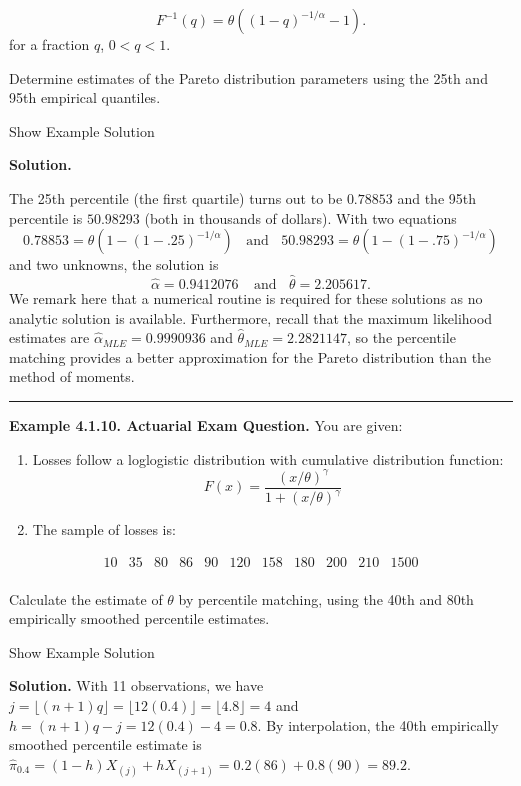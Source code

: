 \documentclass[]{book}
\providecommand{\tightlist}{%
  \setlength{\itemsep}{0pt}\setlength{\parskip}{0pt}}
\theoremstyle{definition}
\theoremstyle{definition}
\theoremstyle{definition}
\theoremstyle{remark}
\begin{document}
\[F^{-1}(q) = \theta \left( (1-q)^{-1/\alpha} -1 \right).\] for a
fraction \(q\), \(0<q<1\).

Determine estimates of the Pareto distribution parameters using the 25th
and 95th empirical quantiles.

Show Example Solution

\hypertarget{toggleExampleSelect.1.9}{}
\textbf{Solution.}

The 25th percentile (the first quartile) turns out to be \(0.78853\) and
the 95th percentile is \(50.98293\) (both in thousands of dollars). With
two equations
\[0.78853 = \theta \left( 1- (1-.25)^{-1/\alpha} \right) \ \ \ \ \text{and} \ \ \ \ 50.98293 = \theta \left( 1- (1-.75)^{-1/\alpha} \right)\]
and two unknowns, the solution is
\[\hat{\alpha} = 0.9412076 \ \ \ \ \ \text{and} \ \ \ \
\hat{\theta} = 2.205617 .\] We remark here that a numerical routine is
required for these solutions as no analytic solution is available.
Furthermore, recall that the maximum likelihood estimates are
\(\hat{\alpha}_{MLE} = 0.9990936\) and
\(\hat{\theta}_{MLE} = 2.2821147\), so the percentile matching provides
a better approximation for the Pareto distribution than the method of
moments.

\begin{center}\rule{0.5\linewidth}{\linethickness}\end{center}

\textbf{Example 4.1.10. Actuarial Exam Question.} You are given:

\begin{enumerate}
\def\labelenumi{(\roman{enumi})}
\tightlist
\item
  Losses follow a loglogistic distribution with cumulative distribution
  function:
  \[F(x) = \frac{\left(x/\theta\right)^{\gamma}}{1+\left(x/\theta\right)^{\gamma}}\]
\item
  The sample of losses is:
\end{enumerate}

\[\begin{array}{ccccccccccc}
10 &35 &80 &86 &90 &120 &158 &180 &200 &210 &1500 \\
\end{array}\]

Calculate the estimate of \(\theta\) by percentile matching, using the
40th and 80th empirically smoothed percentile estimates.

Show Example Solution

\hypertarget{toggleExampleSelect.1.10}{}
\textbf{Solution.} With 11 observations, we have
\(j=\lfloor(n+1)q\rfloor = \lfloor 12(0.4) \rfloor = \lfloor 4.8\rfloor=4\)
and \(h=(n+1)q-j = 12(0.4)-4=0.8\). By interpolation, the 40th
empirically smoothed percentile estimate is
\(\hat{\pi}_{0.4} = (1-h) X_{(j)} + h X_{(j+1)} = 0.2(86)+0.8(90)=89.2\).
\end{document}
